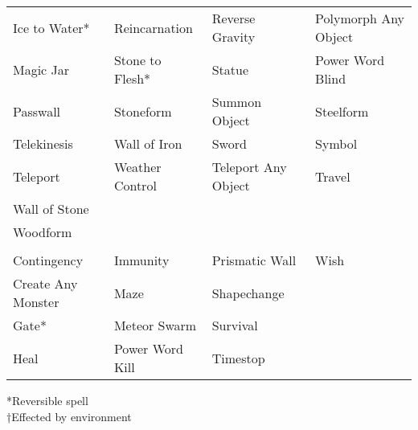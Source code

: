 \begin {table}[H]
\begin{tabularx}{\columnwidth}{XYYY}
	Ice to Water* & Reincarnation & Reverse Gravity & Polymorph Any Object\\
	Magic Jar & Stone to Flesh* & Statue & Power Word Blind\\
	Passwall & Stoneform & Summon Object & Steelform\\
	Telekinesis & Wall of Iron & Sword & Symbol\\
	Teleport & Weather Control & Teleport Any Object & Travel\\
	Wall of Stone &  &  &\\
	Woodform &  &  &\\
	\\
	Contingency & Immunity & Prismatic Wall & Wish\\
	Create Any Monster & Maze & Shapechange &\\
	Gate* & Meteor Swarm & Survival &\\
	Heal & Power Word Kill & Timestop &\
	\end {tabularx}
	*Reversible spell\\
	†Effected by environment
\end {table}
